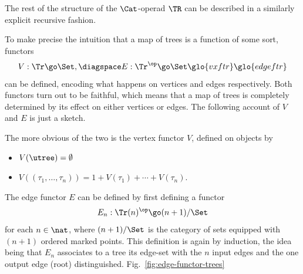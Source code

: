 The rest of the structure of the $\Cat$-operad $\TR$ can be described in a
similarly explicit recursive fashion.  

To make precise the intuition that a map of trees is a function of
some sort, functors
\[
V: \Tr \go \Set,
\diagspace
E: \Tr^\op \go \Set%
% 
\glo{vxftr}\glo{edgeftr}%
%
\index{vertex!functor}%
%
\index{edge!functor}%
%
\index{tree!vertex functor}%
%
\index{tree!edge functor}
% 
\]
can be defined, encoding what happens on vertices and edges respectively.
Both functors turn out to be faithful, which means that a map of trees is
completely determined by its effect on either vertices or edges.  The
following account of $V$ and $E$ is just a sketch.

The more obvious of the two is the vertex functor $V$, defined on objects
by
%
\begin{itemize}
\item $V(\utree) = \emptyset$
\item $V((\tau_1, \ldots, \tau_n)) = 1 + V(\tau_1) + \cdots + V(\tau_n)$.
\end{itemize}
%
The edge functor $E$ can be defined by first defining a functor
\[
E_n: \Tr(n)^\op \go (n+1)/\Set
\]
for each $n\in\nat$, where $(n+1)/\Set$ is the category of sets equipped
with $(n+1)$ ordered marked points.  This definition is again by induction,
the idea being that $E_n$ associates to a tree its edge-set with the $n$
input edges and the one output edge (root) distinguished.
Fig.~\ref{fig:edge-functor-trees}
%
